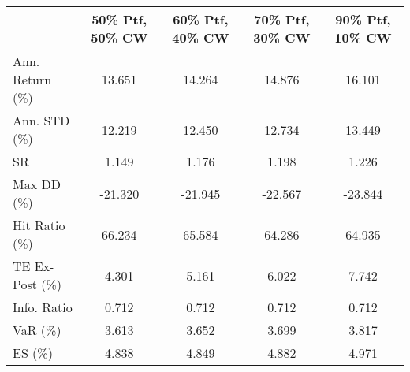 \begin{tabular}{lcccc}
\toprule
{} &  50\% Ptf, 50\% CW &  60\% Ptf, 40\% CW &  70\% Ptf, 30\% CW &  90\% Ptf, 10\% CW \\
\midrule
Ann. Return (\%) &           13.651 &           14.264 &           14.876 &           16.101 \\
Ann. STD (\%)    &           12.219 &           12.450 &           12.734 &           13.449 \\
SR              &            1.149 &            1.176 &            1.198 &            1.226 \\
Max DD (\%)      &          -21.320 &          -21.945 &          -22.567 &          -23.844 \\
Hit Ratio (\%)   &           66.234 &           65.584 &           64.286 &           64.935 \\
TE Ex-Post (\%)  &            4.301 &            5.161 &            6.022 &            7.742 \\
Info. Ratio     &            0.712 &            0.712 &            0.712 &            0.712 \\
VaR (\%)         &            3.613 &            3.652 &            3.699 &            3.817 \\
ES (\%)          &            4.838 &            4.849 &            4.882 &            4.971 \\
\bottomrule
\end{tabular}

